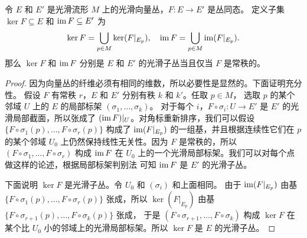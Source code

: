 \begin{theorem}
  令 $E$ 和 $E'$ 是光滑流形 $M$ 上的光滑向量丛，$F:E\to E'$ 是丛同态。
  定义子集 $\ker F\subseteq E$ 和 $\operatorname{im} F\subseteq E'$ 为
  \[
    \ker F=\bigcup_{p\in M} \ker(F|_{E_p}),\quad 
    \operatorname{im} F=\bigcup_{p\in M} \operatorname{im}(F|_{E_p}).
  \]
  那么 $\ker F$ 和 $\operatorname{im} F$ 分别是 $E$ 和 $E'$ 的光滑子丛当且仅当
  $F$ 是常秩的。
\end{theorem}
\begin{proof}
  因为向量丛的纤维必须有相同的维数，所以必要性是显然的。下面证明充分性。
  假设 $F$ 有常秩 $r$，$E$ 和 $E'$ 分别有秩 $k$ 和 $k'$。任取 $p\in M$，
  选取 $p$ 的某个邻域 $U$ 上的 $E$ 的局部标架 $(\sigma_1,\dots,\sigma_k)$。
  对于每个 $i$，$F\circ\sigma_i:U\to E'$ 是 $E'$ 的光滑局部截面，所以张成了
  $(\operatorname{im} F)|_U$。对角标重新排序，我们可以假设 $\bigl\{F\circ \sigma_1(p),\dots,F\circ\sigma_r(p)\bigr\}$
  构成了 $\operatorname{im} (F|_{E_p})$ 的一组基，并且根据连续性它们在 $p$ 的某个邻域
  $U_0$ 上仍然保持线性无关性。因为 $F$ 是常秩的，所以
  $(F\circ\sigma_1,\dots,F\circ\sigma_r)$ 构成 $\operatorname{im} F$ 在 $U_0$
  上的一个光滑局部标架。我们可以对每个点做这样的论述，根据局部标架判别法
  可知 $\operatorname{im} F$ 是 $E'$ 的光滑子丛。

  下面说明 $\ker F$ 是光滑子丛。令 $U_0$ 和 $(\sigma_i)$ 和上面相同。
  由于 $\operatorname{im} (F|_{E_p})$ 由基 $\bigl\{F\circ \sigma_1(p),\dots,F\circ\sigma_r(p)\bigr\}$
  张成，所以 $\ker(F|_{E_p})$ 由基 $\bigl\{F\circ \sigma_{r+1}(p),\dots,F\circ\sigma_k(p)\bigr\}$ 张成，
  于是 $(F\circ\sigma_{r+1},\dots,F\circ\sigma_k)$ 构成 $\ker F$
  在某个比 $U_0$ 小的邻域上的光滑局部标架。所以 $\ker F$
  是 $E$ 的光滑子丛。
\end{proof}




